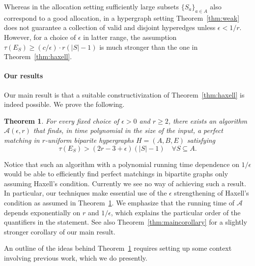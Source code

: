 \documentclass[11pt]{article}
\newtheorem{theorem}{Theorem}[section]
\theoremstyle{definition}
\theoremstyle{remark}
\begin{document}
Whereas in the allocation setting sufficiently large subsets
$\{S_a\}_{a \in A}$ also correspond to a good allocation, in a
hypergraph setting Theorem~\ref{thm:weak} does not guarantee a
collection of valid and disjoint hyperedges unless $\epsilon < 1/r$.
However, for a choice of $\epsilon$ in latter range, the assumption
$\tau(E_S) \geq (c/\epsilon) \cdot r(|S|-1)$ is much stronger than the
one in Theorem~\ref{thm:haxell}.

\paragraph{Our results} Our main result is that a suitable
constructivization of Theorem~\ref{thm:haxell} is indeed possible. We
prove the following.

\begin{theorem}\label{thm:main}
  For every fixed choice of $\epsilon >0$ and $r \geq 2$, there exists
  an algorithm $\mathcal{A}(\epsilon, r)$ that finds, in time
  polynomial in the size of the input, a perfect matching in
  $r$-uniform biparite hypergraphs $H=(A,B,E)$ satisfying
  \[\tau(E_S) > (2r-3 + \epsilon)(|S|-1) \quad \forall S \subseteq
  A.\]
\end{theorem}



Notice that such an algorithm with a polynomial running time
dependence on $1/\epsilon$ would be able to efficiently find perfect
matchings in bipartite graphs only assuming Haxell's
condition. Currently we see no way of achieving such a result. In
particular, our techniques make essential use of the $\epsilon$
strengthening of Haxell's condition as assumed in
Theorem~\ref{thm:main}. We emphasize that the running time of
$\mathcal{A}$ depends exponentially on $r$ and $1/\epsilon$, which
explains the particular order of the quantifiers in the statement. See
also Theorem~\ref{thm:maincorollary} for a slightly stronger corollary of
our main result.

An outline of the ideas behind Theorem~\ref{thm:main} requires setting
up some context involving previous work, which we do presently.
\end{document}
